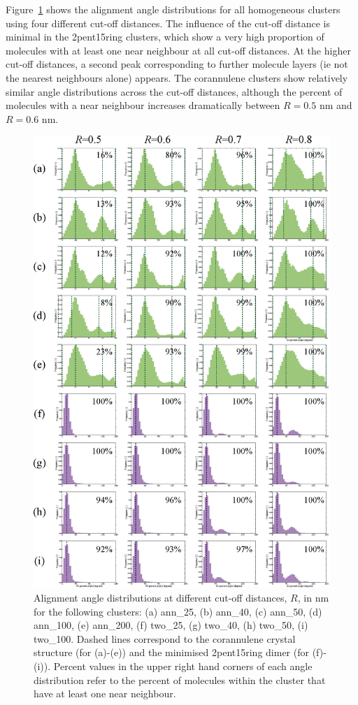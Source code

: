 Figure~\ref{figSI:alignmentangles_cutoffs} shows the alignment angle distributions for all homogeneous clusters using four different cut-off distances.  The influence of the cut-off distance is minimal in the 2pent15ring clusters, which show a very high proportion of molecules with at least one near neighbour at all cut-off distances.  At the higher cut-off distances, a second peak corresponding to further molecule layers (ie not the nearest neighbours alone) appears.  The corannulene clusters show relatively similar angle distributions across the cut-off distances, although the percent of molecules with a near neighbour increases dramatically between $R=0.5$ nm and $R=0.6$ nm.  
%
\begin{figure}[!tbh]
\centering
\includegraphics[width=0.85\linewidth]{Figures/AlignmentAnglesCutoffAssessment_SI.eps}
\caption{Alignment angle distributions at different cut-off distances, $R$, in nm for the following clusters: (a) ann\_25, (b) ann\_40, (c) ann\_50, (d) ann\_100, (e) ann\_200, (f) two\_25, (g) two\_40, (h) two\_50, (i) two\_100. Dashed lines correspond to the corannulene crystal structure (for (a)-(e)) and the minimised 2pent15ring dimer (for (f)-(i)). Percent values in the upper right hand corners of each angle distribution refer to the percent of molecules within the cluster that have at least one near neighbour.}
\label{figSI:alignmentangles_cutoffs}
\end{figure}
%

